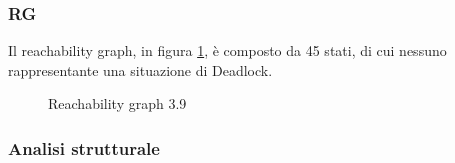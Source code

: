 \documentclass[a4paper]{article}
\begin{document}
\subsubsection{RG}
Il reachability graph, in figura \ref{FIG:3.9RG}, è composto da 45 stati, di cui nessuno rappresentante una situazione di Deadlock.
\begin{figure}[!ht]
\centering
{}
\caption{Reachability graph 3.9} \label{FIG:3.9RG}
\end{figure}
\newpage
\subsubsection{Analisi strutturale}
\end{document}
